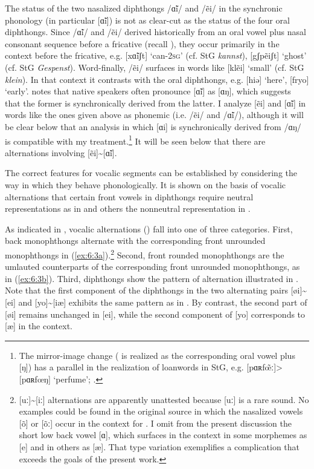 The status of the two nasalized diphthongs /\~ɑi/ and /ẽi/ in the synchronic phonology (in particular [\~ɑi]) is not as clear-cut as the status of the four oral diphthongs. Since /\~ɑi/ and /ẽi/ derived historically from an oral vowel plus nasal consonant sequence before a fricative (recall ), they occur primarily in the context before the fricative, e.g. [x\~ɑiʃt] ‘can-\textsc{2sg}’ (cf. StG \textit{kannst}), [gʃpẽiʃt] ‘ghost’ (cf. StG \textit{Gespenst}). Word-finally, /ẽi/ surfaces in words like [klẽi] ‘small’ (cf. StG \textit{klein}). In that context it contrasts with the oral diphthongs, e.g. [hiə] ‘here’, [fryo] ‘early’. \citet[45]{Wipf1904} notes that native speakers often pronounce [\~ɑi] as [ɑŋ], which suggests that the former is synchronically derived from the latter. I analyze [ẽi] and [\~ɑi] in words like the ones given above as phonemic (i.e. /ẽi/ and /\~ɑi/), although it will be clear below that an analysis in which [ɑi] is synchronically derived from /ɑŋ/ is compatible with my treatment.\footnote{{The mirror-image change ( is realized as the corresponding oral vowel plus [ŋ]) has a parallel in the realization of  loanwords in StG, e.g. [pɑʀf\~{œ}ː]>[pɑʀfœŋ] ‘perfume’; \citet[65]{Mangold2005}.}} It will be seen below that there are  alternations involving [ẽi]{\textasciitilde}[\~ɑi].

The correct features for vocalic segments can be established by considering the way in which they behave phonologically. It is shown on the basis of vocalic alternations that certain front vowels in diphthongs require neutral representations as in  and others the nonneutral representation in .

As indicated in , vocalic alternations () fall into one of three categories. First, back monophthongs alternate with the corresponding front unrounded monophthongs in (\ref{ex:6:3a}).\footnote{{[uː]{\textasciitilde}[iː] alternations are apparently unattested because [uː] is a rare sound. No examples could be found in the original source in which the nasalized vowels [õ] or [õː] occur in the context for . I omit from the present discussion the short low back vowel [ɑ], which surfaces in the  context in some morphemes as [e] and in others as [æ]. That type variation exemplifies a complication that exceeds the goals of the present work.} } Second, front rounded monophthongs are the umlauted counterparts of the corresponding front unrounded monophthongs, as in (\ref{ex:6:3b}). Third, diphthongs show the pattern of alternation illustrated in . Note that the first component of the diphthongs in the two alternating pairs [øi]{\textasciitilde}[ei] and [yo]{\textasciitilde}[iæ] exhibits the same pattern as in . By contrast, the second part of [øi] remains unchanged in [ei], while the second component of [yo] corresponds to [æ] in the  context.

